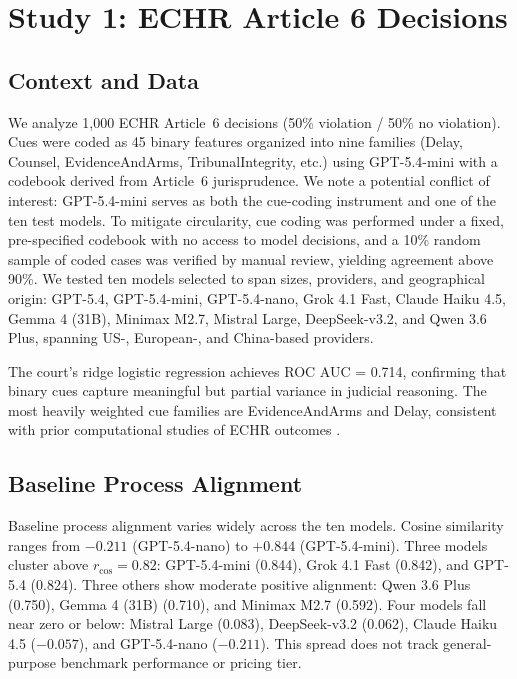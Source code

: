 \documentclass{article}
\begin{document}

\section{Study 1: ECHR Article 6 Decisions}

\subsection{Context and Data}

We analyze 1,000 ECHR Article~6 decisions (50\% violation / 50\% no violation). Cues were coded as 45 binary features organized into nine families (Delay, Counsel, EvidenceAndArms, TribunalIntegrity, etc.) using GPT-5.4-mini with a codebook derived from Article~6 jurisprudence. We note a potential conflict of interest: GPT-5.4-mini serves as both the cue-coding instrument and one of the ten test models. To mitigate circularity, cue coding was performed under a fixed, pre-specified codebook with no access to model decisions, and a 10\% random sample of coded cases was verified by manual review, yielding agreement above 90\%. We tested ten models selected to span sizes, providers, and geographical origin: GPT-5.4, GPT-5.4-mini, GPT-5.4-nano, Grok 4.1 Fast, Claude Haiku 4.5, Gemma 4 (31B), Minimax M2.7, Mistral Large, DeepSeek-v3.2, and Qwen 3.6 Plus, spanning US-, European-, and China-based providers.

The court's ridge logistic regression achieves ROC AUC = 0.714, confirming that binary cues capture meaningful but partial variance in judicial reasoning. The most heavily weighted cue families are EvidenceAndArms and Delay, consistent with prior computational studies of ECHR outcomes \citep{aletras2016predicting,chalkidis2021paragraph}.

\subsection{Baseline Process Alignment}

Baseline process alignment varies widely across the ten models. Cosine similarity ranges from $-0.211$ (GPT-5.4-nano) to $+0.844$ (GPT-5.4-mini). Three models cluster above $r_{\cos} = 0.82$: GPT-5.4-mini (0.844), Grok 4.1 Fast (0.842), and GPT-5.4 (0.824). Three others show moderate positive alignment: Qwen 3.6 Plus (0.750), Gemma 4 (31B) (0.710), and Minimax M2.7 (0.592). Four models fall near zero or below: Mistral Large (0.083), DeepSeek-v3.2 (0.062), Claude Haiku 4.5 ($-0.057$), and GPT-5.4-nano ($-0.211$). This spread does not track general-purpose benchmark performance or pricing tier.
\end{document}
